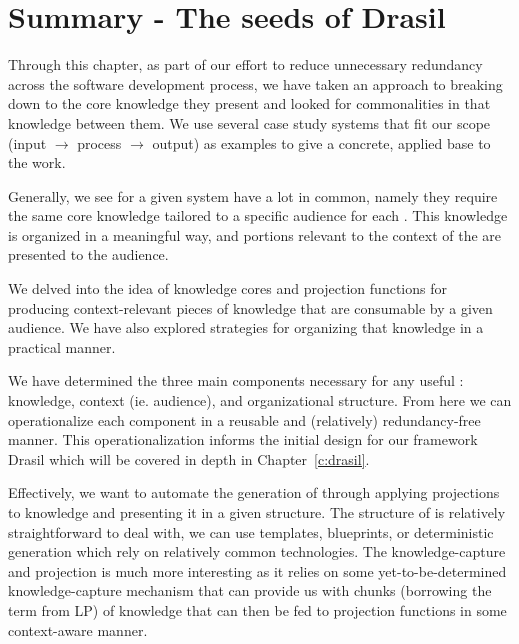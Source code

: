   
\section{Summary - The seeds of Drasil}

Through this chapter, as part of our effort to reduce unnecessary redundancy 
across the software development process, we have taken an approach to breaking 
down \sfs{} to the core knowledge they present and looked for commonalities in 
that knowledge between them. We use several case study systems that fit our 
scope (input $\rightarrow$ process $\rightarrow$ output) as examples to give a 
concrete, applied base to the work.

Generally, we see \sfs{} for a given system have a lot in common, namely they 
require the same core knowledge tailored to a specific audience for each \sf{}. 
This knowledge is organized in a meaningful way, and portions relevant to the 
context of the \sf{} are presented to the audience.

We delved into the idea of knowledge cores and projection functions for 
producing context-relevant pieces of knowledge that are consumable by a given 
audience. We have also explored strategies for organizing that knowledge in a 
practical manner. 

We have determined the three main components necessary for any useful \sf{}: 
knowledge, context (ie. audience), and organizational structure. From here we 
can operationalize each component in a reusable and (relatively) 
redundancy-free manner. This operationalization informs the initial design for 
our framework Drasil which will be covered in depth in Chapter~\ref{c:drasil}. 

Effectively, we want to automate the generation of \sfs{} through applying 
projections to knowledge and presenting it in a given structure. The structure 
of \sfs{} is relatively straightforward to deal with, we can use templates, 
blueprints, or deterministic generation which rely on relatively common 
technologies. The knowledge-capture and projection is much more interesting as 
it relies on some yet-to-be-determined knowledge-capture mechanism that can 
provide us with chunks (borrowing the term from LP) of knowledge that can then 
be fed to projection functions in some context-aware manner.

